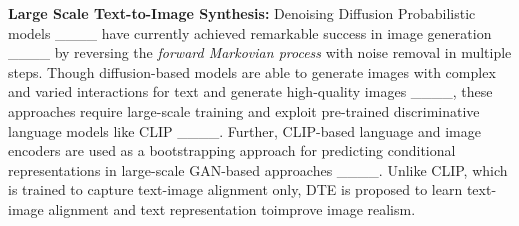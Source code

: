 \noindent \textbf{Large Scale Text-to-Image Synthesis:} Denoising Diffusion Probabilistic models ____ have currently achieved remarkable success in image generation ____ by reversing the \textit{forward Markovian process} with noise removal in multiple steps. Though diffusion-based models are able to generate images with complex and varied interactions for text and generate high-quality images ____, these approaches require large-scale training and exploit pre-trained discriminative language models like CLIP ____. Further, CLIP-based language and image encoders are used as a bootstrapping approach for predicting conditional representations in large-scale GAN-based approaches ____. Unlike CLIP, which is trained to capture text-image alignment only, DTE is proposed to learn text-image alignment and text representation toimprove image realism. 

